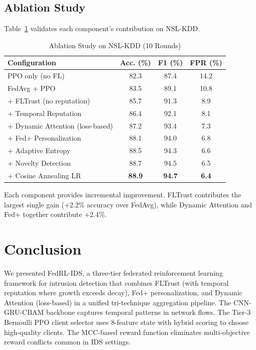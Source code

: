 \documentclass[conference]{IEEEtran}
\begin{document}
\subsection{Ablation Study}

Table~\ref{tab:ablation} validates each component's contribution on NSL-KDD.

\begin{table}[t]
\centering
\caption{Ablation Study on NSL-KDD (10 Rounds)}
\label{tab:ablation}
\begin{tabular}{lccc}
\toprule
\textbf{Configuration} & \textbf{Acc. (\%)} & \textbf{F1 (\%)} & \textbf{FPR (\%)} \\
\midrule
PPO only (no FL) & 82.3 & 87.4 & 14.2 \\
FedAvg + PPO & 83.5 & 89.1 & 10.8 \\
+ FLTrust (no reputation) & 85.7 & 91.3 & 8.9 \\
+ Temporal Reputation & 86.4 & 92.1 & 8.1 \\
+ Dynamic Attention (loss-based) & 87.2 & 93.4 & 7.3 \\
+ Fed+ Personalization & 88.1 & 94.0 & 6.8 \\
+ Adaptive Entropy & 88.5 & 94.3 & 6.6 \\
+ Novelty Detection & 88.7 & 94.5 & 6.5 \\
+ Cosine Annealing LR & \textbf{88.9} & \textbf{94.7} & \textbf{6.4} \\
\bottomrule
\end{tabular}
\end{table}

Each component provides incremental improvement. FLTrust contributes the largest single gain (+2.2\% accuracy over FedAvg), while Dynamic Attention and Fed+ together contribute +2.4\%.

\section{Conclusion}
\label{sec:conclusion}

We presented FedRL-IDS, a three-tier federated reinforcement learning framework for intrusion detection that combines FLTrust (with temporal reputation where growth exceeds decay), Fed+ personalization, and Dynamic Attention (loss-based) in a unified tri-technique aggregation pipeline. The CNN-GRU-CBAM backbone captures temporal patterns in network flows. The Tier-3 Bernoulli PPO client selector uses 8-feature state with hybrid scoring to choose high-quality clients. The MCC-based reward function eliminates multi-objective reward conflicts common in IDS settings.
\end{document}
